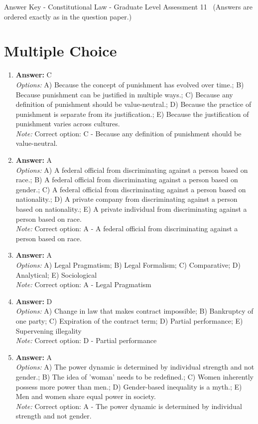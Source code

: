 \documentclass[12pt]{article}
\begin{document}
\begin{center}
Answer Key - Constitutional Law - Graduate Level Assessment 11 \
\small (Answers are ordered exactly as in the question paper.)
\end{center}

\section*{Multiple Choice}
\begin{enumerate}[label=\arabic*.]
\item \textbf{Answer:} C
\\ \textit{Options:} A) Because the concept of punishment has evolved over time.; B) Because punishment can be justified in multiple ways.; C) Because any definition of punishment should be value-neutral.; D) Because the practice of punishment is separate from its justification.; E) Because the justification of punishment varies across cultures.
\\ \textit{Note:} Correct option: C - Because any definition of punishment should be value-neutral.
\item \textbf{Answer:} A
\\ \textit{Options:} A) A federal official from discriminating against a person based on race.; B) A federal official from discriminating against a person based on gender.; C) A federal official from discriminating against a person based on nationality.; D) A private company from discriminating against a person based on nationality.; E) A private individual from discriminating against a person based on race.
\\ \textit{Note:} Correct option: A - A federal official from discriminating against a person based on race.
\item \textbf{Answer:} A
\\ \textit{Options:} A) Legal Pragmatism; B) Legal Formalism; C) Comparative; D) Analytical; E) Sociological
\\ \textit{Note:} Correct option: A - Legal Pragmatism
\item \textbf{Answer:} D
\\ \textit{Options:} A) Change in law that makes contract impossible; B) Bankruptcy of one party; C) Expiration of the contract term; D) Partial performance; E) Supervening illegality
\\ \textit{Note:} Correct option: D - Partial performance
\item \textbf{Answer:} A
\\ \textit{Options:} A) The power dynamic is determined by individual strength and not gender.; B) The idea of 'woman' needs to be redefined.; C) Women inherently possess more power than men.; D) Gender-based inequality is a myth.; E) Men and women share equal power in society.
\\ \textit{Note:} Correct option: A - The power dynamic is determined by individual strength and not gender.
\end{enumerate}
\end{document}
